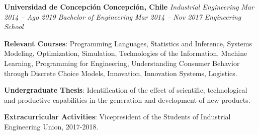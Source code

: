 \item
\headerrow
{\textbf{Universidad de Concepción}}
{\textbf{Concepción, Chile}}
\headerrow
{\emph{Industrial Engineering}}
{\emph{Mar 2014 -- Ago 2019}}
\headerrow
{\emph{Bachelor of Engineering}}
{\emph{Mar 2014 -- Nov 2017}}
{\emph{Engineering School}}
\begin{itemize*}
    \item \textbf{Relevant Courses}: Programming Languages, Statistics and
    Inference, Systems Modeling, Optimization, Simulation, Technologies
    of the Information, Machine Learning, Programming for Engineering, 
    Understanding Consumer Behavior through Discrete Choice Models, Innovation, 
    Innovation Systems, Logistics.
    \item \textbf{Undergraduate Thesis}: Identification of the effect of scientific, 
    technological and productive capabilities in the generation and development of 
    new products.
    \item \textbf{Extracurricular Activities}: Vicepresident of the Students of Industrial
    Engineering Union, 2017-2018.
\end{itemize*}